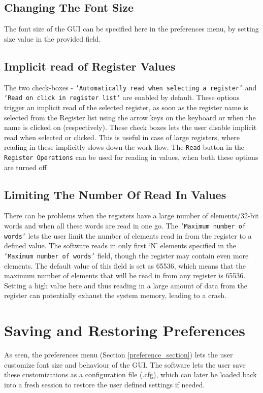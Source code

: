 \subsection{Changing The Font Size}
The font size of the GUI can be specified here in the preferences menu, by setting size value in the provided field.

\subsection{Implicit read of Register Values}\label{sub::imp_read}
The two check-boxes - \texttt{`Automatically read when selecting a register'} and \texttt{`Read on click in register list'} are enabled by default. These options trigger an implicit read of the selected register, as soon as the register name is selected from the Register list using the arrow keys on the keyboard or when the name is clicked on (respectively). These check boxes lets the user disable implicit read when selected or clicked. This is useful in case of large registers, where reading in these implicitly slows down the work flow. The \texttt{Read} button in the \texttt{Register Operations} can be used for reading in values, when both these options are turned off

\subsection{Limiting The Number Of Read In Values}\label{subsub::graph_x_axis}
There can be problems when the registers have a large number of elements/32-bit words and when all these words are read in one go. The \texttt{`Maximum number of words'} lets the user limit the number of elements read in from the register to a defined value. The software reads in only first `N' elements specified in the \texttt{`Maximum number of words'} field, though the register may contain even more elements. The default value of this field is set as 65536, which means that the maximum number of elements that will be read in from any register is 65536. Setting a high value here and thus reading in a large amount of data from the register can potentially exhaust the system memory, leading to a crash.
		
\section{Saving and Restoring Preferences}
As seen, the preferences menu (Section \ref{preference_section}) lets the user customize font size and behaviour of the GUI. The software lets the user save these customizations as a configuration file (.cfg), which can later be loaded back into a fresh session to restore the user defined settings if needed.

